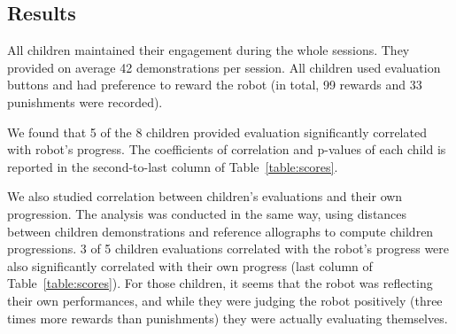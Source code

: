 \documentclass{sig-alternate}
\begin{document}
\subsection{Results}

All children maintained their engagement during the whole sessions. They provided
on average 42 demonstrations per session. All children used evaluation buttons and
had preference to reward the robot (in total, 99 rewards and 33 punishments were recorded). 

We found that 5 of the 8 children provided evaluation significantly correlated with robot's progress. The coefficients of correlation and p-values of each child is reported in the second-to-last column of Table~\ref{table:scores}.

We also studied correlation between children's evaluations and their own
progression. The analysis was conducted in the same way, using distances between children demonstrations and reference allographs to compute children progressions.
3 of 5 children evaluations correlated with the robot's progress were also significantly correlated with their own progress (last column of Table~\ref{table:scores}). For
those children, it seems that the robot was reflecting their own performances, and while they
were judging the robot positively (three times more rewards than punishments)
they were actually evaluating themselves.
\end{document}
